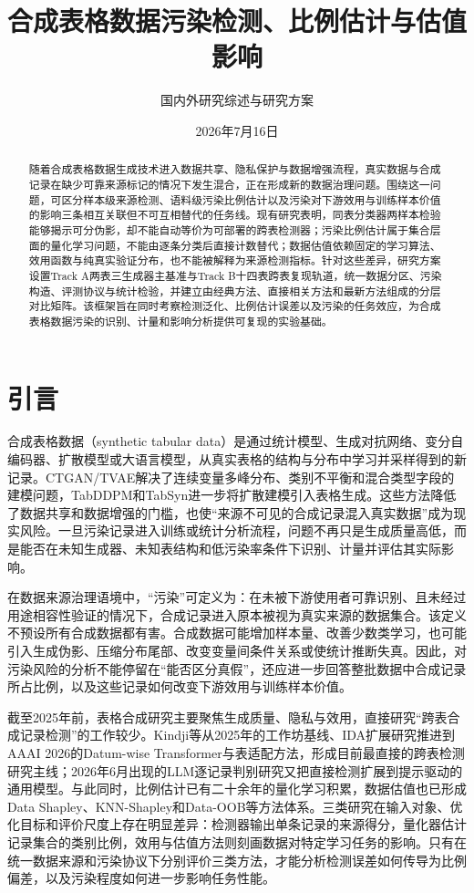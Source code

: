 \documentclass[
  chinese,
  12pt,
  a4paper,
  chinese,
  UTF8]{ctexart}
\title{合成表格数据污染检测、比例估计与估值影响}
\subtitle{国内外研究综述与研究方案}
\author{}
\date{2026年7月16日}
\begin{document}
\maketitle
\begin{abstract}
随着合成表格数据生成技术进入数据共享、隐私保护与数据增强流程，真实数据与合成记录在缺少可靠来源标记的情况下发生混合，正在形成新的数据治理问题。围绕这一问题，可区分样本级来源检测、语料级污染比例估计以及污染对下游效用与训练样本价值的影响三条相互关联但不可互相替代的任务线。现有研究表明，同表分类器两样本检验能够揭示可分伪影，却不能自动等价为可部署的跨表检测器；污染比例估计属于集合层面的量化学习问题，不能由逐条分类后直接计数替代；数据估值依赖固定的学习算法、效用函数与纯真实验证分布，也不能被解释为来源检测指标。针对这些差异，研究方案设置Track
A两表三生成器主基准与Track
B十四表跨表复现轨道，统一数据分区、污染构造、评测协议与统计检验，并建立由经典方法、直接相关方法和最新方法组成的分层对比矩阵。该框架旨在同时考察检测泛化、比例估计误差以及污染的任务效应，为合成表格数据污染的识别、计量和影响分析提供可复现的实验基础。
\end{abstract}

{
\setcounter{tocdepth}{3}
\tableofcontents
}
\section{引言}\label{ux5f15ux8a00}

合成表格数据（synthetic tabular
data）是通过统计模型、生成对抗网络、变分自编码器、扩散模型或大语言模型，从真实表格的结构与分布中学习并采样得到的新记录。CTGAN/TVAE解决了连续变量多峰分布、类别不平衡和混合类型字段的建模问题\autocite{xu2019ctgan}，TabDDPM和TabSyn进一步将扩散建模引入表格生成\autocite{kotelnikov2023tabddpm,zhang2024tabsyn}。这些方法降低了数据共享和数据增强的门槛，也使``来源不可见的合成记录混入真实数据''成为现实风险。一旦污染记录进入训练或统计分析流程，问题不再只是生成质量高低，而是能否在未知生成器、未知表结构和低污染率条件下识别、计量并评估其实际影响。

在数据来源治理语境中，``污染''可定义为：在未被下游使用者可靠识别、且未经过用途相容性验证的情况下，合成记录进入原本被视为真实来源的数据集合。该定义不预设所有合成数据都有害。合成数据可能增加样本量、改善少数类学习，也可能引入生成伪影、压缩分布尾部、改变变量间条件关系或使统计推断失真。因此，对污染风险的分析不能停留在``能否区分真假''，还应进一步回答整批数据中合成记录所占比例，以及这些记录如何改变下游效用与训练样本价值。

截至2025年前，表格合成研究主要聚焦生成质量、隐私与效用，直接研究``跨表合成记录检测''的工作较少。Kindji等从2025年的工作坊基线\autocite{kindji2025cross}、IDA扩展研究\autocite{kindji2025wild}推进到AAAI
2026的Datum-wise
Transformer与表适配方法\autocite{kindji2026robust}，形成目前最直接的跨表检测研究主线；2026年6月出现的LLM逐记录判别研究又把直接检测扩展到提示驱动的通用模型\autocite{slokom2026llm}。与此同时，比例估计已有二十余年的量化学习积累，数据估值也已形成Data
Shapley、KNN-Shapley和Data-OOB等方法体系。三类研究在输入对象、优化目标和评价尺度上存在明显差异：检测器输出单条记录的来源得分，量化器估计记录集合的类别比例，效用与估值方法则刻画数据对特定学习任务的影响。只有在统一数据来源和污染协议下分别评价三类方法，才能分析检测误差如何传导为比例偏差，以及污染程度如何进一步影响任务性能。
\end{document}

